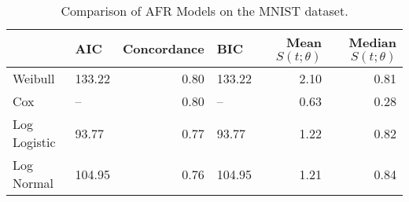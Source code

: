 \begin{table*}
\caption{Comparison of AFR Models on the MNIST dataset.}
\label{tab:mnist}
\begin{tabular}{llrlrr}
\toprule
 & AIC & Concordance & BIC & Mean $S(t;\theta)$ & Median $S(t; \theta)$ \\
\midrule
Weibull & 133.22 & 0.80 & 133.22 & 2.10 & 0.81 \\
Cox & -- & 0.80 & -- & 0.63 & 0.28 \\
Log Logistic & 93.77 & 0.77 & 93.77 & 1.22 & 0.82 \\
Log Normal & 104.95 & 0.76 & 104.95 & 1.21 & 0.84 \\
\bottomrule
\end{tabular}
\end{table*}
